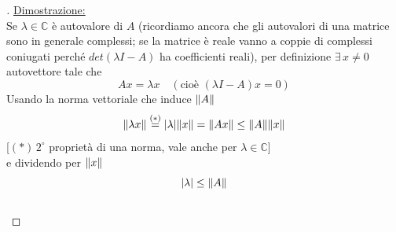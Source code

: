 \begin{proof}[\unskip\nopunct]
\uline{Dimostrazione:}\\
Se $\lambda \in \mathbb{C}$ è autovalore di $A$ (ricordiamo ancora che gli autovalori di una matrice sono in generale complessi; se la matrice è reale vanno a coppie di complessi coniugati perché $det(\lambda I-A)$ ha coefficienti reali), per definizione $\exists \, x \ne 0$ autovettore tale che
\[Ax = \lambda x \quad (\text{cioè } (\lambda I-A)x = 0)\]
Usando la norma vettoriale che induce $\lVert A\rVert$
\[\lVert\lambda x\rVert \overset{(*)}{=} \lvert\lambda\rvert\lVert x\rVert = \lVert Ax\rVert \le \lVert A\rVert\lVert x\rVert\]
[$(*)\, 2^{\circ}$ proprietà di una norma, vale anche per $\lambda \in \mathbb{C}$] \\
e dividendo per $\lVert x\rVert$
\[\lvert\lambda\rvert \le \lVert A\rVert\]\\
\end{proof}


